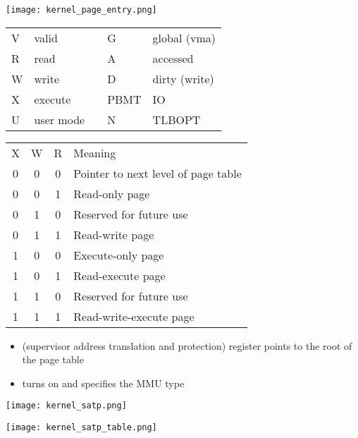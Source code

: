 
\begin{center}
    \texttt{[image: kernel\_page\_entry.png]}
\end{center}

\renewcommand{\arraystretch}{1.3}
\setlength{\oldtabcolsep}{\tabcolsep}\setlength\tabcolsep{6pt}

\begin{tabularx}{\linewidth}{@{}llcll@{}}
    V & valid     &  & G    & global (vma)  \\
    R & read      &  & A    & accessed      \\
    W & write     &  & D    & dirty (write) \\
    X & execute   &  & PBMT & IO            \\
    U & user mode &  & N    & TLBOPT
\end{tabularx}

\begin{tabularx}{\linewidth}{@{}cccl@{}}
    X & W & R & Meaning                             \\
    \cmidrule{1-4}
    0 & 0 & 0 & Pointer to next level of page table \\
    0 & 0 & 1 & Read-only page                      \\
    0 & 1 & 0 & Reserved for future use             \\
    0 & 1 & 1 & Read-write page                     \\
    1 & 0 & 0 & Execute-only page                   \\
    1 & 0 & 1 & Read-execute page                   \\
    1 & 1 & 0 & Reserved for future use             \\
    1 & 1 & 1 & Read-write-execute page
\end{tabularx}

\renewcommand{\arraystretch}{1}
\setlength\tabcolsep{\oldtabcolsep}

\newpar{}
\begin{itemize}
    \item {} (supervisor address translation and protection) register points to the root of the page table
    \item {} turns on and specifies the MMU type
\end{itemize}
\begin{center}
    \texttt{[image: kernel\_satp.png]}
\end{center}
\begin{center}
    \texttt{[image: kernel\_satp\_table.png]}
\end{center}

